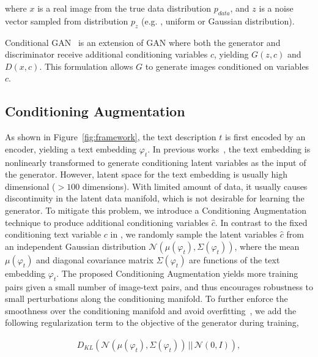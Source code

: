 where $x$ is a real image from the true data distribution $p_{data}$, and $z$ is a noise vector sampled from distribution $p_{z}$ (e.g. , uniform or Gaussian distribution). 

Conditional GAN~\cite{gauthier2015conditional, Mirza14} is an extension of GAN where both the generator and discriminator receive additional conditioning variables $c$, yielding $G(z,c)$ and $D(x,c)$. This formulation allows $G$ to generate images conditioned on variables $c$. 

\subsection{Conditioning Augmentation}

As shown in Figure~\ref{fig:framework}, the text description $t$ is first encoded by an encoder, yielding a text embedding $\varphi_{t}$. In previous works~\cite{reed2016generative,reed2016learning}, the text embedding is nonlinearly transformed to generate conditioning latent variables as the input of the generator. However, latent space for the text embedding is usually high dimensional ($>100$ dimensions). With limited amount of data, it usually causes discontinuity in the latent data manifold, which is not desirable for learning the generator. To mitigate this problem, we introduce a Conditioning Augmentation technique to produce additional conditioning variables $\hat{c}$. In contrast to the fixed conditioning text variable $c$ in \cite{reed2016generative,reed2016learning}, we randomly sample the latent variables $\hat{c}$ from an independent Gaussian distribution $\mathcal{N}(\mu(\varphi_{t}), \Sigma(\varphi_{t}))$, where the mean $\mu(\varphi_{t})$ and diagonal covariance matrix $\Sigma(\varphi_{t})$ are functions of the text embedding $\varphi_{t}$. The proposed Conditioning Augmentation yields more training pairs given a small number of image-text pairs, and thus encourages robustness to small perturbations along the conditioning manifold. To further enforce the smoothness over the conditioning manifold and avoid overfitting~\cite{Doersch16, LarsenSLW16}, we add the following regularization term to the objective of the generator during training,

\begin{equation}\label{eq:GaussianKL}
\begin{aligned}
D_{KL}(\mathcal{N}(\mu(\varphi_{t}), \Sigma(\varphi_{t})) \, || \, \mathcal{N}(0, I)),
\end{aligned}
\end{equation}


